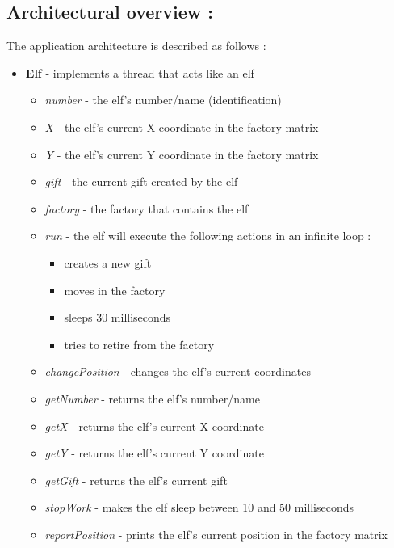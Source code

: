 \documentclass{article}
\begin{document}
    \subsection{\textbf{Architectural overview :}}
    \vspace{0.5cm}
    The application architecture is described as follows :
        \begin{itemize}
        \item \textbf{Elf} - implements a thread that acts like an elf
            \begin{itemize}
            \item \textit{number} - the elf's number/name (identification)
            \item \textit{X} - the elf's current X coordinate in the factory matrix
            \item \textit{Y} - the elf's current Y coordinate in the factory matrix
            \item \textit{gift} - the current gift created by the elf
            \item \textit{factory} - the factory that contains the elf
            \item \textit{run} - the elf will execute the following actions in an infinite loop :
                \begin{itemize}
                    \item creates a new gift
                    \item moves in the factory
                    \item sleeps 30 milliseconds
                    \item tries to retire from the factory
                \end{itemize}
            \item \textit{changePosition} - changes the elf's current coordinates
            \item \textit{getNumber} - returns the elf's number/name
            \item \textit{getX} - returns the elf's current X coordinate
            \item \textit{getY} - returns the elf's current Y coordinate
            \item \textit{getGift} - returns the elf's current gift
            \item \textit{stopWork} - makes the elf sleep between 10 and 50 milliseconds
            \item \textit{reportPosition} - prints the elf's current position in the factory matrix

\end{itemize}
\end{itemize}
\end{document}
